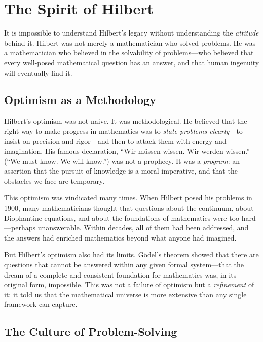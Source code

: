 \section{The Spirit of Hilbert}

It is impossible to understand Hilbert's legacy without understanding the \emph{attitude} behind it. Hilbert was not merely a mathematician who solved problems. He was a mathematician who believed in the solvability of problems---who believed that every well-posed mathematical question has an answer, and that human ingenuity will eventually find it.

\subsection{Optimism as a Methodology}

Hilbert's optimism was not naive. It was methodological. He believed that the right way to make progress in mathematics was to \emph{state problems clearly}---to insist on precision and rigor---and then to attack them with energy and imagination. His famous declaration, ``Wir m\"ussen wissen. Wir werden wissen.'' (``We must know. We will know.'') was not a prophecy. It was a \emph{program}: an assertion that the pursuit of knowledge is a moral imperative, and that the obstacles we face are temporary.

This optimism was vindicated many times. When Hilbert posed his problems in 1900, many mathematicians thought that questions about the continuum, about Diophantine equations, and about the foundations of mathematics were too hard---perhaps unanswerable. Within decades, all of them had been addressed, and the answers had enriched mathematics beyond what anyone had imagined.

But Hilbert's optimism also had its limits. G\"odel's theorem showed that there are questions that cannot be answered within any given formal system---that the dream of a complete and consistent foundation for mathematics was, in its original form, impossible. This was not a failure of optimism but a \emph{refinement} of it: it told us that the mathematical universe is more extensive than any single framework can capture.

\subsection{The Culture of Problem-Solving}


